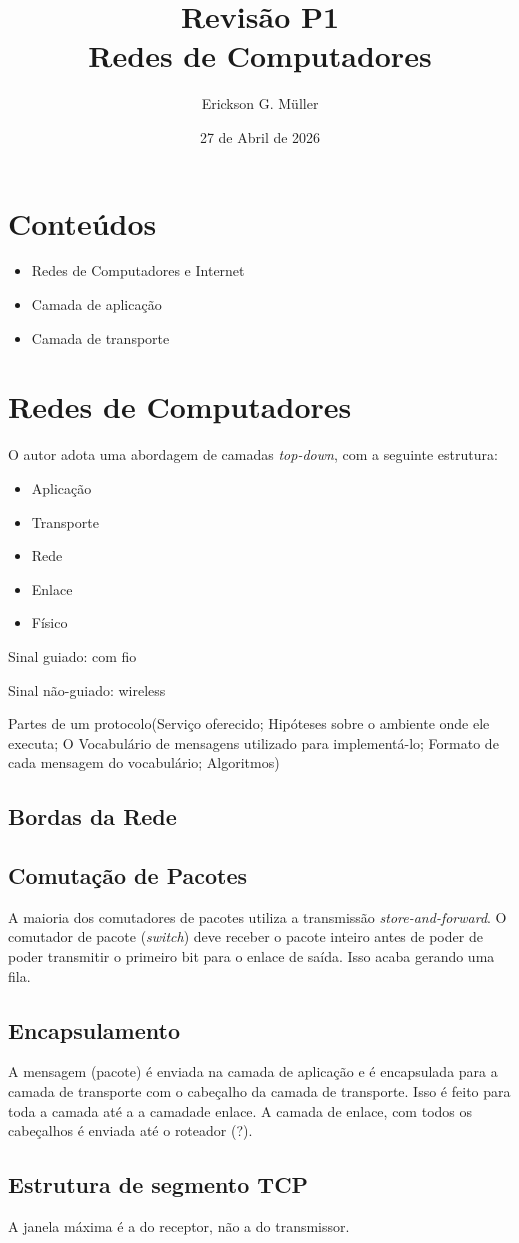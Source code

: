\documentclass[ ]{article}
\title{Revisão P1 \\ Redes de Computadores}
\author{Erickson G. Müller}
\date{27 de Abril de 2026}
\begin{document}
\maketitle

\section*{Conteúdos}
	\begin{itemize}
		\item Redes de Computadores e Internet
		\item Camada de aplicação
		\item Camada de transporte
	\end{itemize}
	
\section{Redes de Computadores}
	O autor adota uma abordagem de camadas \textit{top-down}, com a seguinte estrutura:
	\begin{itemize}
		\item Aplicação
		\item Transporte
		\item Rede
		\item Enlace
		\item Físico
	\end{itemize}
	
	Sinal guiado: com fio
	
	Sinal não-guiado: wireless
	
	Partes de um protocolo(Serviço oferecido; Hipóteses sobre o ambiente onde ele executa; O Vocabulário de mensagens utilizado para implementá-lo; Formato de cada mensagem do vocabulário; Algoritmos)


	\subsection{Bordas da Rede}
	
	\subsection{Comutação de Pacotes}
		A maioria dos comutadores de pacotes utiliza a transmissão \textit{store-and-forward}. O comutador de pacote (\textit{switch}) deve receber o pacote inteiro antes de poder de poder transmitir o primeiro bit para o enlace de saída. Isso acaba gerando uma fila.
	\subsection{Encapsulamento}
		A mensagem (pacote) é enviada na camada de aplicação e é encapsulada para a camada de transporte com o cabeçalho da camada de transporte. Isso é feito para toda a camada até a a camadade enlace. A camada de enlace, com todos os cabeçalhos é enviada até o roteador (?).

	\subsection{Estrutura de segmento TCP}
		A janela máxima é a do receptor, não a do transmissor.
\end{document}
